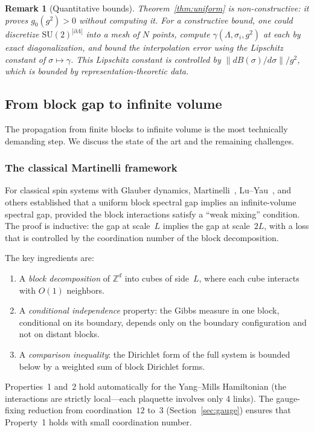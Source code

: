 \documentclass[12pt,a4paper]{article}
\newtheorem{remark}[theorem]{Remark}
\newcommand{\Z}{\mathbb{Z}}
\begin{document}
\begin{remark}[Quantitative bounds]
Theorem~\ref{thm:uniform} is non-constructive: it proves $g_0(g^2)>0$ without computing it. For a constructive bound, one could discretize $\mathrm{SU}(2)^{|\partial\Lambda|}$ into a mesh of $N$ points, compute $\gamma(\Lambda,\sigma_i,g^2)$ at each by exact diagonalization, and bound the interpolation error using the Lipschitz constant of $\sigma\mapsto\gamma$. This Lipschitz constant is controlled by $\|dB(\sigma)/d\sigma\|/g^2$, which is bounded by representation-theoretic data.
\end{remark}

\subsection{From block gap to infinite volume}\label{sec:block_to_inf}

The propagation from finite blocks to infinite volume is the most technically demanding step. We discuss the state of the art and the remaining challenges.

\subsubsection{The classical Martinelli framework}

For classical spin systems with Glauber dynamics, Martinelli~\cite{Martinelli1999}, Lu--Yau~\cite{LuYau}, and others established that a uniform block spectral gap implies an infinite-volume spectral gap, provided the block interactions satisfy a ``weak mixing'' condition. The proof is inductive: the gap at scale~$L$ implies the gap at scale~$2L$, with a loss that is controlled by the coordination number of the block decomposition.

The key ingredients are:
\begin{enumerate}
\item A \emph{block decomposition} of $\Z^d$ into cubes of side~$L$, where each cube interacts with $O(1)$ neighbors.
\item A \emph{conditional independence} property: the Gibbs measure in one block, conditional on its boundary, depends only on the boundary configuration and not on distant blocks.
\item A \emph{comparison inequality}: the Dirichlet form of the full system is bounded below by a weighted sum of block Dirichlet forms.
\end{enumerate}

Properties~1 and~2 hold automatically for the Yang--Mills Hamiltonian (the interactions are strictly local---each plaquette involves only 4 links). The gauge-fixing reduction from coordination~$12$ to~$3$ (Section~\ref{sec:gauge}) ensures that Property~1 holds with small coordination number.
\end{document}
